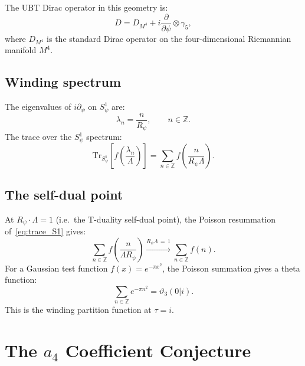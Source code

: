 \documentclass[12pt,a4paper]{article}
\theoremstyle{remark}
\begin{document}
The UBT Dirac operator in this geometry is:
\begin{equation}
  D = D_{M^4} + i\frac{\partial}{\partial\psi}\otimes\gamma_5,
  \label{eq:D_ubt}
\end{equation}
where $D_{M^4}$ is the standard Dirac operator on the four-dimensional
Riemannian manifold $M^4$.

\subsection{Winding spectrum}

The eigenvalues of $i\partial_\psi$ on $S^1_\psi$ are:
\begin{equation}
  \lambda_n = \frac{n}{R_\psi}, \qquad n\in\mathbb{Z}.
\end{equation}
The trace over the $S^1_\psi$ spectrum:
\begin{equation}
  \mathrm{Tr}_{S^1_\psi}\!\left[f\!\left(\frac{\lambda_n}{\Lambda}\right)\right]
  = \sum_{n\in\mathbb{Z}} f\!\left(\frac{n}{R_\psi\Lambda}\right).
  \label{eq:trace_S1}
\end{equation}

\subsection{The self-dual point}

At $R_\psi\cdot\Lambda = 1$ (i.e.\ the T-duality self-dual point), the
Poisson resummation of~\eqref{eq:trace_S1} gives:
\begin{equation}
  \sum_{n\in\mathbb{Z}} f\!\left(\frac{n}{\Lambda R_\psi}\right)
  \xrightarrow{R_\psi\Lambda\,=\,1}
  \sum_{n\in\mathbb{Z}} f(n).
  \label{eq:poisson_self_dual}
\end{equation}
For a Gaussian test function $f(x) = e^{-\pi x^2}$, the Poisson summation
gives a theta function:
\begin{equation}
  \sum_{n\in\mathbb{Z}} e^{-\pi n^2} = \vartheta_3(0|i).
  \label{eq:theta3_from_poisson}
\end{equation}
This is the winding partition function at $\tau = i$.

\section{The $a_4$ Coefficient Conjecture}
\label{sec:conjecture}
\end{document}
